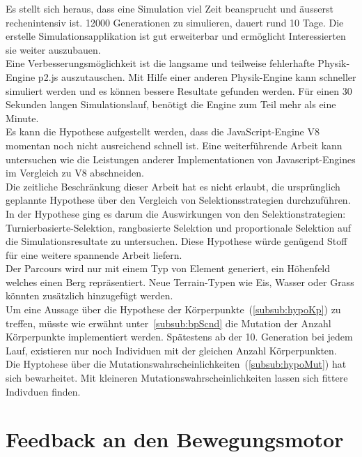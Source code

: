     Es stellt sich heraus, dass eine Simulation viel Zeit beansprucht und äusserst rechenintensiv ist.
    12000 Generationen zu simulieren, dauert rund 10 Tage.
    Die erstelle Simulationsapplikation ist gut erweiterbar und ermöglicht Interessierten sie weiter auszubauen.
    \\
    Eine Verbesserungsmöglichkeit ist die langsame und teilweise fehlerhafte Physik-Engine p2.js auszutauschen.
    Mit Hilfe einer anderen Physik-Engine kann schneller simuliert werden und es können bessere Resultate gefunden werden.
    Für einen 30 Sekunden langen Simulationslauf, benötigt die Engine zum Teil mehr als eine Minute.
    \\
    Es kann die Hypothese aufgestellt werden, dass die JavaScript-Engine V8 momentan noch nicht ausreichend schnell ist.
    Eine weiterführende Arbeit kann untersuchen wie die Leistungen anderer Implementationen von Javascript-Engines im
    Vergleich zu V8 abschneiden.
    \\
    Die zeitliche Beschränkung dieser Arbeit hat es nicht erlaubt,
    die ursprünglich geplannte Hypothese über den Vergleich von Selektionsstrategien durchzuführen.
    In der Hypothese ging es darum die Auswirkungen von den Selektionstrategien: Turnierbasierte-Selektion, rangbasierte Selektion
    und proportionale Selektion auf die Simulationsresultate zu untersuchen.
    Diese Hypothese würde genügend Stoff für eine weitere spannende Arbeit liefern.
    \\
    Der Parcours wird nur mit einem Typ von Element generiert, ein Höhenfeld welches einen Berg repräsentiert.
    Neue Terrain-Typen wie Eis, Wasser oder Grass könnten zusätzlich hinzugefügt werden.
    \\
    Um eine Aussage über die Hypothese der Körperpunkte~(\vref{subsub:hypoKp}) zu treffen,
    müsste wie erwähnt unter~\vref{subsub:bpScnd} die Mutation der Anzahl Körperpunkte implementiert werden.
    Spätestens ab der 10. Generation bei jedem Lauf, existieren nur noch Individuen mit der gleichen Anzahl Körperpunkten.
    \\
    Die Hyptohese über die Mutationswahrscheinlichkeiten~(\vref{subsub:hypoMut}) hat sich bewarheitet.
    Mit kleineren Mutationswahrscheinlichkeiten lassen sich fittere Indivduen finden.

  \section{Feedback an den Bewegungsmotor\label{sec:PerspectiveFeedback}}

